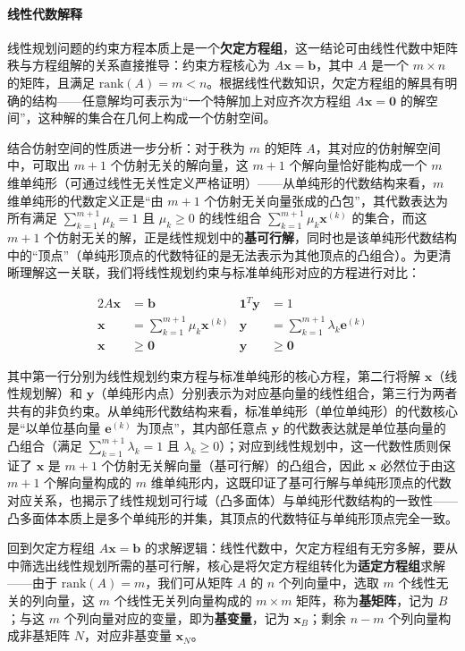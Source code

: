 \documentclass[12pt]{article}
\theoremstyle{plain}
\theoremstyle{definition}
\newcommand{\rank}{\mathrm{rank}}
\begin{document}
\paragraph{线性代数解释}

线性规划问题的约束方程本质上是一个\textbf{欠定方程组}，这一结论可由线性代数中矩阵秩与方程组解的关系直接推导：约束方程核心为 $A \bm{x} = \bm{b}$，其中 $A$ 是一个 $m \times n$ 的矩阵，且满足 $\rank(A) = m < n$。根据线性代数知识，欠定方程组的解具有明确的结构——任意解均可表示为“一个特解加上对应齐次方程组 $A \bm{x} = \bm{0}$ 的解空间”，这种解的集合在几何上构成一个仿射空间。

结合仿射空间的性质进一步分析：对于秩为 $m$ 的矩阵 $A$，其对应的仿射解空间中，可取出 $m+1$ 个仿射无关的解向量，这 $m+1$ 个解向量恰好能构成一个 $m$ 维单纯形（可通过线性无关性定义严格证明）——从单纯形的代数结构来看，$m$ 维单纯形的代数定义正是“由 $m+1$ 个仿射无关向量张成的凸包”，其代数表达为所有满足 $\sum_{k=1}^{m+1} \mu_k = 1$ 且 $\mu_k \geq 0$ 的线性组合 $\sum_{k=1}^{m+1} \mu_k \bm{x}^{(k)}$ 的集合，而这 $m+1$ 个仿射无关的解，正是线性规划中的\textbf{基可行解}，同时也是该单纯形代数结构中的“顶点”（单纯形顶点的代数特征的是无法表示为其他顶点的凸组合）。为更清晰理解这一关联，我们将线性规划约束与标准单纯形对应的方程进行对比：

\begin{alignat*}{2}
    A \bm{x} &= \bm{b} & \bm{1}^T \bm{y} &= 1 \\
    \bm{x} &= \sum_{k=1}^{m+1} \mu_k \bm{x}^{(k)} & \bm{y} &= \sum_{k=1}^{m+1} \lambda_k \bm{e}^{(k)} \\
    \bm{x} &\geq \bm{0} & \bm{y} &\geq \bm{0}
\end{alignat*}

其中第一行分别为线性规划约束方程与标准单纯形的核心方程，第二行将解 $\bm{x}$（线性规划解）和 $\bm{y}$（单纯形内点）分别表示为对应基向量的线性组合，第三行为两者共有的非负约束。从单纯形代数结构来看，标准单纯形（单位单纯形）的代数核心是“以单位基向量 $\bm{e}^{(k)}$ 为顶点”，其内部任意点 $\bm{y}$ 的代数表达就是单位基向量的凸组合（满足 $\sum_{k=1}^{m+1} \lambda_k = 1$ 且 $\lambda_k \geq 0$）；对应到线性规划中，这一代数性质则保证了 $\bm{x}$ 是 $m+1$ 个仿射无关解向量（基可行解）的凸组合，因此 $\bm{x}$ 必然位于由这 $m+1$ 个解向量构成的 $m$ 维单纯形内，这既印证了基可行解与单纯形顶点的代数对应关系，也揭示了线性规划可行域（凸多面体）与单纯形代数结构的一致性——凸多面体本质上是多个单纯形的并集，其顶点的代数特征与单纯形顶点完全一致。

回到欠定方程组 $A \bm{x} = \bm{b}$ 的求解逻辑：线性代数中，欠定方程组有无穷多解，要从中筛选出线性规划所需的基可行解，核心是将欠定方程组转化为\textbf{适定方程组}求解——由于 $\rank(A) = m$，我们可从矩阵 $A$ 的 $n$ 个列向量中，选取 $m$ 个线性无关的列向量，这 $m$ 个线性无关列向量构成的 $m \times m$ 矩阵，称为\textbf{基矩阵}，记为 $B$；与这 $m$ 个列向量对应的变量，即为\textbf{基变量}，记为 $\bm{x}_B$；剩余 $n-m$ 个列向量构成非基矩阵 $N$，对应非基变量 $\bm{x}_N$。
\end{document}
